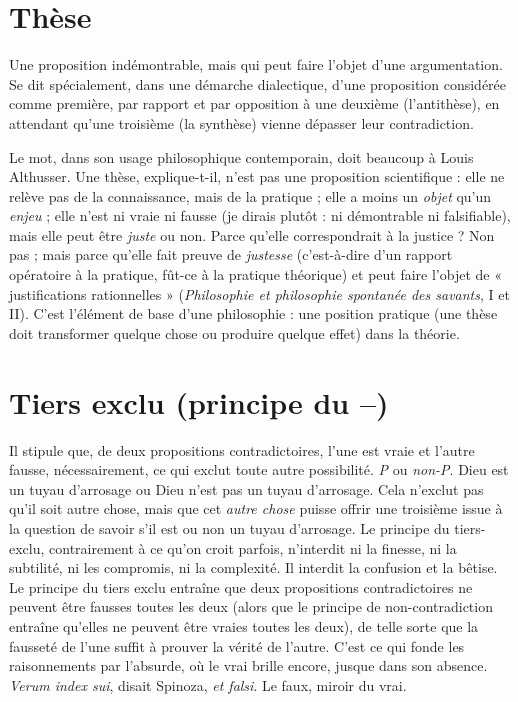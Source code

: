 \section{Thèse}
Une proposition indémontrable, mais qui peut faire l’objet d’une
argumentation. Se dit spécialement, dans une démarche dialectique,
d’une proposition considérée comme première, par rapport et par opposition
à une deuxième (l'antithèse), en attendant qu’une troisième (la synthèse)
vienne dépasser leur contradiction.

Le mot, dans son usage philosophique contemporain, doit beaucoup à
Louis Althusser. Une thèse, explique-t-il, n’est pas une proposition scientifique :
elle ne relève pas de la connaissance, mais de la pratique ; elle a moins
un {\it objet} qu’un {\it enjeu} ; elle n’est ni vraie ni fausse (je dirais plutôt : ni démontrable
ni falsifiable), mais elle peut être {\it juste} ou non. Parce qu’elle correspondrait
à la justice ? Non pas ; mais parce qu’elle fait preuve de {\it justesse} (c’est-à-dire
d’un rapport opératoire à la pratique, fût-ce à la pratique théorique) et
peut faire l’objet de « justifications rationnelles » ({\it Philosophie et philosophie
spontanée des savants}, I et II). C’est l'élément de base d’une philosophie : une
position pratique (une thèse doit transformer quelque chose ou produire
quelque effet) dans la théorie.

\section{Tiers exclu (principe du {\bf --})}
Il stipule que, de deux propositions contradictoires,
l’une est vraie et l’autre fausse,
nécessairement, ce qui exclut toute autre possibilité. {\it P} ou {\it non-P}. Dieu est un
tuyau d’arrosage ou Dieu n’est pas un tuyau d’arrosage. Cela n’exclut pas qu’il
soit autre chose, mais que cet {\it autre chose} puisse offrir une troisième issue à la
question de savoir s’il est ou non un tuyau d’arrosage. Le principe du tiers-exclu,
contrairement à ce qu’on croit parfois, n’interdit ni la finesse, ni la subtilité,
ni les compromis, ni la complexité. Il interdit la confusion et la bêtise.
Le principe du tiers exclu entraîne que deux propositions contradictoires ne
peuvent être fausses toutes les deux (alors que le principe de non-contradiction
entraîne qu'elles ne peuvent être vraies toutes les deux), de telle sorte que la
fausseté de l’une suffit à prouver la vérité de l’autre. C’est ce qui fonde les raisonnements
par l'absurde, où le vrai brille encore, jusque dans son absence.
{\it Verum index sui}, disait Spinoza, {\it et falsi}. Le faux, miroir du vrai.

